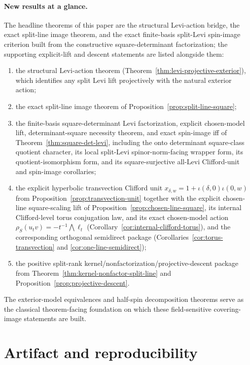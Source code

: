 \documentclass{birkjour}
\theoremstyle{plain}
\theoremstyle{definition}
\theoremstyle{remark}
\begin{document}
\paragraph{New results at a glance.}
The headline theorems of this paper are the structural Levi-action bridge,
the exact split-line image theorem, and the exact finite-basis split-Levi
spin-image criterion built from the constructive square-determinant
factorization; the supporting explicit-lift and descent statements are listed
alongside them:
\begin{enumerate}
\item the structural Levi-action theorem
  (Theorem~\ref{thm:levi-projective-exterior}), which identifies any split Levi
  lift projectively with the natural exterior action;
\item the exact split-line image theorem of
  Proposition~\ref{prop:split-line-square};
\item the finite-basis square-determinant Levi factorization, explicit
  chosen-model lift, determinant-square necessity theorem, and exact spin-image
  iff of Theorem~\ref{thm:square-det-levi}, including the onto determinant
  square-class quotient character, its local split-Levi spinor-norm-facing
  wrapper form, its quotient-isomorphism form, and its square-surjective all-Levi
  Clifford-unit and spin-image corollaries;
\item the explicit hyperbolic transvection Clifford unit
  $x_{\delta,w}=1+\iota(\delta,0)\iota(0,w)$ from
  Proposition~\ref{prop:transvection-unit} together with the explicit chosen-line
  square-scaling lift of Proposition~\ref{prop:chosen-line-square}, its internal
  Clifford-level torus conjugation law, and its exact chosen-model action
  $\rho_S(u_t v)=-t^{-1}\bigwedge \ell_t$
  (Corollary~\ref{cor:internal-clifford-torus}), and the corresponding
  orthogonal semidirect package
  (Corollaries~\ref{cor:torus-transvection} and
  \ref{cor:one-line-semidirect});
\item the positive split-rank kernel/nonfactorization/projective-descent package
  from Theorem~\ref{thm:kernel-nonfactor-split-line} and
  Proposition~\ref{prop:projective-descent}.
\end{enumerate}
The exterior-model equivalences and half-spin decomposition theorems serve as
the classical theorem-facing foundation on which these field-sensitive
covering-image statements are built.

\section{Artifact and reproducibility}
\label{sec:artifact}
\end{document}
